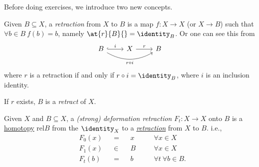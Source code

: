 Before doing exercises, we introduce two new concepts.
\begin{definition}\label{def:retraction}
	Given \(B\subseteq X\), a \emph{retraction} from \(X\) to \(B\) is a map \(f\colon X\to X\) (or \(X\to B\))
	such that \(\forall b\in B\ f(b) = b\), namely \(\at{r}{B}{} = \identity_B\). Or one can see this from
	\[
		\begin{tikzcd}
			B \ar[rr, swap, bend right=30, "r \circ i"] \ar[r,hook,"i"] & X \ar[r, "r"] & B
		\end{tikzcd}
	\]
	where \(r\) is a retraction if and only if \(r\circ i = \identity_B\), where \(i\) is an inclusion identity.

	\par If \(r\) exists, \(B\) is a \emph{retract} of \(X\).
\end{definition}
\begin{definition}\label{def:deformation-retraction}
	Given \(X\) and \(B\subseteq X\), a \emph{(strong) deformation retraction} \(F_t\colon X\to X\) onto \(B\) is
	a \hyperref[def:homotopy]{homotopy} \(\mathrm{rel} B\) from the \(\identity_X\) to a \hyperref[def:retraction]{\emph{retraction}}
	from \(X\) to \(B\). i.e.,
	\[
		\begin{alignedat}{4}
			&F_0(x) &&= &&x\quad &&\forall x\in X\\
			&F_1(x) &&\in &&B\quad &&\forall x\in X\\
			&F_t(b) &&= &&b\quad &&\forall t\ \forall b\in B.
		\end{alignedat}
	\]
\end{definition}

